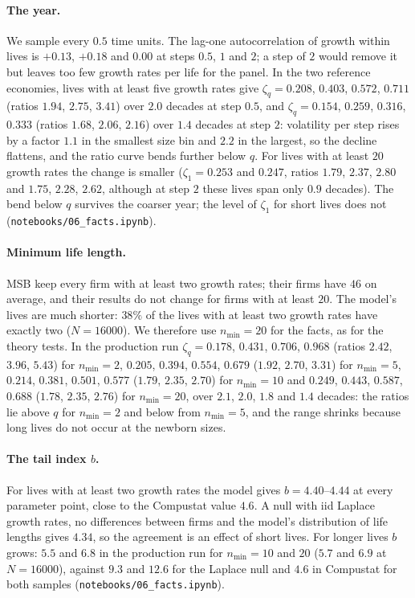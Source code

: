 \documentclass[pre,twocolumn,superscriptaddress,nofootinbib]{revtex4-2}
\begin{document}
\paragraph{The year.}  We sample every $0.5$ time units.  The lag-one autocorrelation of growth within
lives is $+0.13$, $+0.18$ and $0.00$ at steps $0.5$, $1$ and $2$; a step of $2$ would remove it but leaves
too few growth rates per life for the panel.  In the two reference economies, lives with at least five
growth rates give $\zeta_q=0.208$, $0.403$, $0.572$, $0.711$ (ratios $1.94$, $2.75$, $3.41$) over $2.0$
decades at step $0.5$, and $\zeta_q=0.154$, $0.259$, $0.316$, $0.333$ (ratios $1.68$, $2.06$, $2.16$) over
$1.4$ decades at step $2$: volatility per step rises by a factor $1.1$ in the smallest size bin and $2.2$
in the largest, so the decline flattens, and the ratio curve bends further below $q$.  For lives with
at least $20$ growth rates the change is smaller ($\zeta_1=0.253$ and $0.247$, ratios $1.79$, $2.37$,
$2.80$ and $1.75$, $2.28$, $2.62$, although at step $2$ these lives span only $0.9$ decades).  The bend
below $q$ survives the coarser year; the level of $\zeta_1$ for short lives does not
(\texttt{notebooks/06\_facts.ipynb}).

\paragraph{Minimum life length.}  MSB keep every firm with at least two growth rates; their firms have $46$ on
average, and their results do not change for firms with at least $20$.  The model's lives are much shorter:
$38\%$ of the lives with at least two growth rates have exactly two ($N=16000$).  We therefore use
$n_{\min}=20$ for the facts, as for the theory tests.  In the production run $\zeta_q=0.178$, $0.431$, $0.706$, $0.968$
(ratios $2.42$, $3.96$, $5.43$) for $n_{\min}=2$, $0.205$, $0.394$, $0.554$, $0.679$ ($1.92$, $2.70$, $3.31$) for $n_{\min}=5$,
$0.214$, $0.381$, $0.501$, $0.577$ ($1.79$, $2.35$, $2.70$) for $n_{\min}=10$ and $0.249$, $0.443$, $0.587$, $0.688$ ($1.78$, $2.35$,
$2.76$) for $n_{\min}=20$, over $2.1$, $2.0$, $1.8$ and $1.4$ decades: the ratios lie above $q$ for $n_{\min}=2$ and below
from $n_{\min}=5$, and the range shrinks because long lives do not occur at the newborn sizes.

\paragraph{The tail index $b$.}  For lives with at least two growth rates the model gives
$b=4.40$--$4.44$ at every parameter point, close to the Compustat value $4.6$.  A null with iid Laplace
growth rates, no differences between firms and the model's distribution of life lengths gives
$4.34$, so the agreement is an effect of short lives.  For longer lives $b$ grows: $5.5$ and $6.8$ in the production
run for $n_{\min}=10$ and $20$ ($5.7$ and $6.9$ at $N=16000$), against $9.3$ and $12.6$ for the Laplace null and $4.6$ in
Compustat for both samples (\texttt{notebooks/06\_facts.ipynb}).
\end{document}
